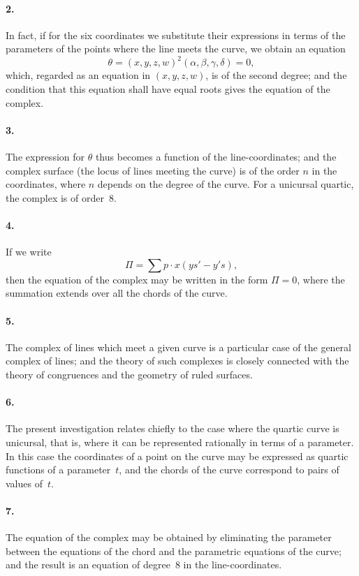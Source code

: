 \documentclass[11pt,a4paper]{book}
\begin{document}
\paragraph{2.} In fact, if for the six coordinates we substitute their expressions in terms of the parameters of the points where the line meets the curve, we obtain an equation
\[
\theta = (x, y, z, w)^{2}(\alpha, \beta, \gamma, \delta) = 0,
\]
which, regarded as an equation in $(x, y, z, w)$, is of the second degree; and the condition that this equation shall have equal roots gives the equation of the complex.

\paragraph{3.} The expression for $\theta$ thus becomes a function of the line-coordinates; and the complex surface (the locus of lines meeting the curve) is of the order $n$ in the coordinates, where $n$ depends on the degree of the curve. For a unicursal quartic, the complex is of order~8.

\paragraph{4.} If we write
\[
\Pi = \sum p \cdot x(ys' - y's),
\]
then the equation of the complex may be written in the form $\Pi = 0$, where the summation extends over all the chords of the curve.

\paragraph{5.} The complex of lines which meet a given curve is a particular case of the general complex of lines; and the theory of such complexes is closely connected with the theory of congruences and the geometry of ruled surfaces.

\paragraph{6.} The present investigation relates chiefly to the case where the quartic curve is unicursal, that is, where it can be represented rationally in terms of a parameter. In this case the coordinates of a point on the curve may be expressed as quartic functions of a parameter~$t$, and the chords of the curve correspond to pairs of values of~$t$.

\paragraph{7.} The equation of the complex may be obtained by eliminating the parameter between the equations of the chord and the parametric equations of the curve; and the result is an equation of degree~8 in the line-coordinates.
\end{document}
